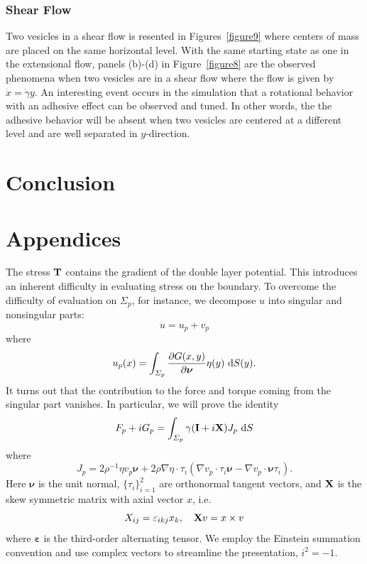 \documentclass[lineno]{jfm}
\newcommand{\nnu}{\boldsymbol{\nu}}
\begin{document}
\subsubsection{Shear Flow}
Two vesicles in a shear flow is resented in Figures~\ref{figure9} where centers of mass are placed on the same horizontal level. With the same starting state as one in the extensional flow, panels (b)-(d) in Figure~\ref{figure8} are the observed phenomena when two vesicles are in a shear flow where the flow is given by $\dot x = \dot\gamma y$. 
An interesting event occurs in the simulation that a rotational behavior with an adhesive effect can be observed and tuned. In other words, the the adhesive behavior will be absent when two vesicles are centered 
at a different level and are well separated in $y$-direction.



\section{\label{conclusion}Conclusion}


\begin{acknowledgments}
\end{acknowledgments}

\appendix

\section{Appendices}
The stress ${\bf T}$ contains the gradient of the double layer potential. This 
introduces an inherent difficulty in evaluating stress on the boundary.
To overcome the difficulty of evaluation on $\Sigma_p$, for instance, we decompose $u$ into singular and nonsingular parts:
\begin{equation}
u = u_p + v_p
\end{equation}
where  
\begin{equation}
u_p(x) = \int_{\Sigma_p} \frac{\partial G(x,y)}{\partial \nnu} \eta(y) \,\dif S(y).
\end{equation}
It turns out that the contribution to the force and torque coming from the singular
part vanishes. In particular, we will prove the identity
\begin{equation}
\label{eq:recipforcetorque}
F_p + iG_p= \int_{\Sigma_p} \gamma ({\bf I}+i{\bf X})J_{p} \,\dif S
\end{equation}
where
 \begin{equation}
\label{eq:jumpstress1}
J_{p} = 2\rho^{-1} \eta  v_p \nnu 
+ 2\rho \nabla \eta \cdot \tau_i(\nabla v_p \cdot \tau_i \nnu -  \nabla
   v_p \cdot \nnu \tau_i).
\end{equation}
Here $\nnu$ is the unit normal, $\{\tau_i\}_{i=1}^2$ are orthonormal tangent vectors,
and ${\bf X}$ is the skew symmetric matrix with axial vector $x$, i.e.
\[X_{ij} = \varepsilon_{ikj}x_k,\quad {\bf X}v = x\times v\]
where $\boldsymbol{\varepsilon}$ is the third-order alternating tensor.
We employ the Einstein summation convention and use complex vectors to streamline the presentation, $i^2 = -1$.
\end{document}
